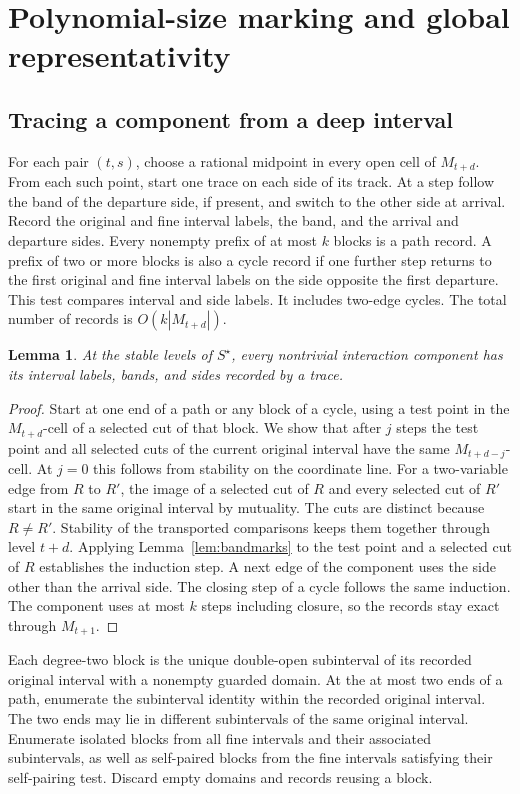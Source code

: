 \documentclass[10pt,letterpaper]{article}
\newtheorem{lemma}{Lemma}
\begin{document}
\section{Polynomial-size marking and global representativity}
\subsection{Tracing a component from a deep interval}
For each pair \((t,s)\), choose a rational midpoint in every open cell of \(M_{t+d}\). From each such point, start one trace on each side of its track. At a step follow the band of the departure side, if present, and switch to the other side at arrival. Record the original and fine interval labels, the band, and the arrival and departure sides. Every nonempty prefix of at most \(k\) blocks is a path record. A prefix of two or more blocks is also a cycle record if one further step returns to the first original and fine interval labels on the side opposite the first departure. This test compares interval and side labels. It includes two-edge cycles. The total number of records is \(O(k|M_{t+d}|)\).

\begin{lemma}\label{lem:trace}
At the stable levels of \(S^\star\), every nontrivial interaction component has its interval labels, bands, and sides recorded by a trace.
\end{lemma}
\begin{proof}
Start at one end of a path or any block of a cycle, using a test point in the \(M_{t+d}\)-cell of a selected cut of that block. We show that after \(j\) steps the test point and all selected cuts of the current original interval have the same \(M_{t+d-j}\)-cell. At \(j=0\) this follows from stability on the coordinate line. For a two-variable edge from \(R\) to \(R'\), the image of a selected cut of \(R\) and every selected cut of \(R'\) start in the same original interval by mutuality. The cuts are distinct because \(R\ne R'\). Stability of the transported comparisons keeps them together through level \(t+d\). Applying Lemma~\ref{lem:bandmarks} to the test point and a selected cut of \(R\) establishes the induction step. A next edge of the component uses the side other than the arrival side. The closing step of a cycle follows the same induction. The component uses at most \(k\) steps including closure, so the records stay exact through \(M_{t+1}\).
\end{proof}

Each degree-two block is the unique double-open subinterval of its recorded original interval with a nonempty guarded domain. At the at most two ends of a path, enumerate the subinterval identity within the recorded original interval. The two ends may lie in different subintervals of the same original interval. Enumerate isolated blocks from all fine intervals and their associated subintervals, as well as self-paired blocks from the fine intervals satisfying their self-pairing test. Discard empty domains and records reusing a block.
\end{document}

